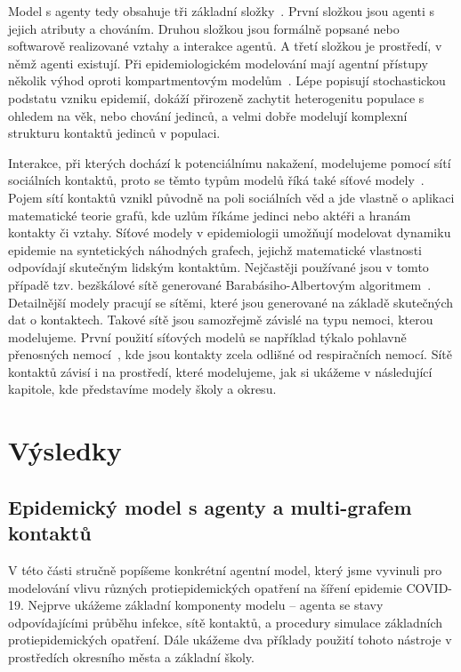 Model s agenty tedy obsahuje tři základní složky~\cite{Macal14}. První složkou jsou agenti s jejich atributy a chováním. Druhou složkou jsou formálně popsané nebo softwarově realizované vztahy a interakce agentů. A třetí složkou je prostředí, v němž agenti existují.   
Při epidemiologickém modelování mají agentní přístupy několik výhod oproti kompartmentovým modelům~\cite{Zino2021}. Lépe popisují stochastickou podstatu vzniku epidemií, dokáží přirozeně zachytit heterogenitu populace s ohledem na věk, nebo chování jedinců, a velmi dobře modelují komplexní strukturu kontaktů jedinců v populaci. 

Interakce, při kterých dochází k potenciálnímu nakažení, modelujeme pomocí sítí sociálních kontaktů, proto se těmto typům modelů říká také síťové modely~\cite{Keeling2005}. Pojem sítí kontaktů vznikl původně na poli sociálních věd a jde vlastně o aplikaci matematické teorie grafů, kde uzlům říkáme jedinci nebo aktéři a hranám kontakty či vztahy. Síťové modely v epidemiologii umožňují modelovat dynamiku epidemie na syntetických náhodných grafech, jejichž matematické vlastnosti odpovídají skutečným lidským kontaktům. Nejčastěji používané jsou v tomto případě tzv. bezškálové sítě generované Barabásiho-Albertovým algoritmem~\cite{Barabasi99}. Detailnější modely pracují se sítěmi, které jsou generované na základě skutečných dat o kontaktech. Takové sítě jsou samozřejmě závislé na typu nemoci, kterou modelujeme. První použití síťových modelů se například týkalo pohlavně přenosných nemocí~\cite{Klovdahl85}, kde jsou kontakty zcela odlišné od respiračních nemocí. Sítě kontaktů závisí i na prostředí, které modelujeme, jak si ukážeme v následující kapitole, kde představíme modely školy a okresu.


\section*{Výsledky} 

\subsection*{Epidemický model s agenty a multi-grafem kontaktů}

V této části stručně popíšeme konkrétní agentní model, který jsme vyvinuli pro modelování vlivu různých protiepidemických opatření na šíření epidemie COVID-19. Nejprve ukážeme základní komponenty modelu -- agenta se stavy odpovídajícími průběhu infekce, sítě kontaktů, a procedury simulace základních protiepidemických opatření. Dále ukážeme dva příklady použití tohoto nástroje v prostředích okresního města a základní školy.  

